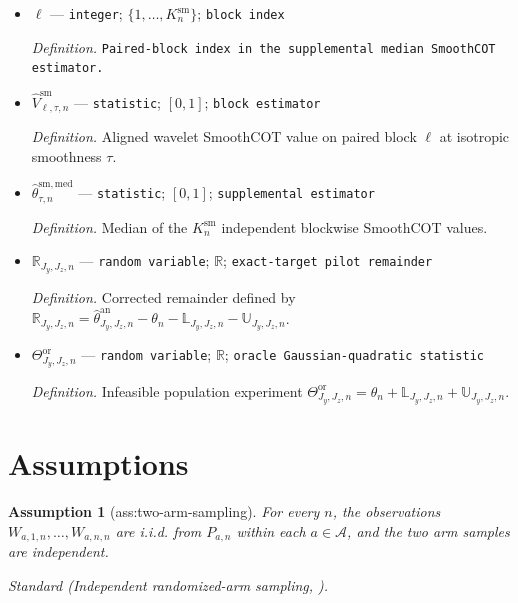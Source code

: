 \documentclass{article}
\newtheorem{assumption}{Assumption}
\begin{document}
\begin{itemize}
  \par\smallskip\noindent\emph{Definition.} SmoothCOT block size \(N_n^{\mathrm{sm}}=\lfloor n/K_n^{\mathrm{sm}}\rfloor\).
  \item \(\ell\) --- \texttt{integer}; \(\{1,\ldots,K_n^{\mathrm{sm}}\}\); \texttt{block index}
  \par\smallskip\noindent\emph{Definition.} \texttt{Paired-\allowbreak{}block index in the supplemental median SmoothCOT estimator.}
  \item \(\widehat V_{\ell,\tau,n}^{\mathrm{sm}}\) --- \texttt{statistic}; \([0,1]\); \texttt{block estimator}
  \par\smallskip\noindent\emph{Definition.} Aligned wavelet SmoothCOT value on paired block \(\ell\) at isotropic smoothness \(\tau\).
  \item \(\widehat\theta^{\mathrm{sm,med}}_{\tau,n}\) --- \texttt{statistic}; \([0,1]\); \texttt{supplemental estimator}
  \par\smallskip\noindent\emph{Definition.} Median of the \(K_n^{\mathrm{sm}}\) independent blockwise SmoothCOT values.
  \item \(\mathbb R_{J_y,J_z,n}\) --- \texttt{random variable}; \(\mathbb R\); \texttt{exact-\allowbreak{}target pilot remainder}
  \par\smallskip\noindent\emph{Definition.} Corrected remainder defined by \(\mathbb R_{J_y,J_z,n}=\widehat\theta^{\mathrm{an}}_{J_y,J_z,n}-\theta_n-\mathbb L_{J_y,J_z,n}-\mathbb U_{J_y,J_z,n}\).
  \item \(\Theta^{\mathrm{or}}_{J_y,J_z,n}\) --- \texttt{random variable}; \(\mathbb R\); \texttt{oracle Gaussian-\allowbreak{}quadratic statistic}
  \par\smallskip\noindent\emph{Definition.} Infeasible population experiment \(\Theta^{\mathrm{or}}_{J_y,J_z,n}=\theta_n+\mathbb L_{J_y,J_z,n}+\mathbb U_{J_y,J_z,n}\).
\end{itemize}

\section{Assumptions}

\begin{assumption}[ass:two-arm-sampling]\label{ass:two-arm-sampling}
For every \(n\), the observations \(W_{a,1,n},\ldots,W_{a,n,n}\) are i.i.d. from \(P_{a,n}\) within each \(a\in\mathcal A\), and the two arm samples are independent.
\par\smallskip\noindent\emph{Standard} (Independent randomized-arm sampling, \cite{LinGaoBlanchetGlynn2026SmoothCOT}).
\end{assumption}
\end{document}
